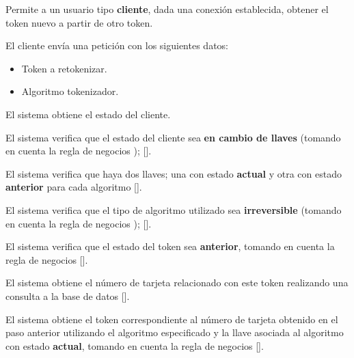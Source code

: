 %
%

{
  Permite a un usuario tipo \textbf{cliente}, dada una conexión establecida,
  obtener el token nuevo a partir de otro token.

  \begin{trayectoriaPrincipal}

    \item El cliente envía una petición con los siguientes datos:
      \begin{itemize}
        \item Token a retokenizar.
        \item Algoritmo tokenizador.
      \end{itemize}

    \item El sistema obtiene el estado del cliente.

    \item El sistema verifica que el estado del cliente sea
      \textbf{en cambio de llaves} (tomando en cuenta la regla de negocios
      );
      [].

    \item El sistema verifica que haya dos llaves; una con estado
      \textbf{actual} y otra con estado \textbf{anterior} para cada algoritmo
      [].

    \item El sistema verifica que el tipo de algoritmo utilizado sea
      \textbf{irreversible} (tomando en cuenta la regla de negocios
      );
      [].

    \item El sistema verifica que el estado del token sea \textbf{anterior},
      tomando en cuenta la regla de negocios 
      [].

    \item El sistema obtiene el número de tarjeta relacionado con este token
      realizando una consulta a la base de datos
      [].

    \item El sistema obtiene el token correspondiente al número de tarjeta
      obtenido en el paso anterior utilizando el algoritmo especificado y la
      llave asociada al algoritmo con estado \textbf{actual}, tomando en cuenta
      la regla de negocios 
      [].


\end{trayectoriaPrincipal}}
